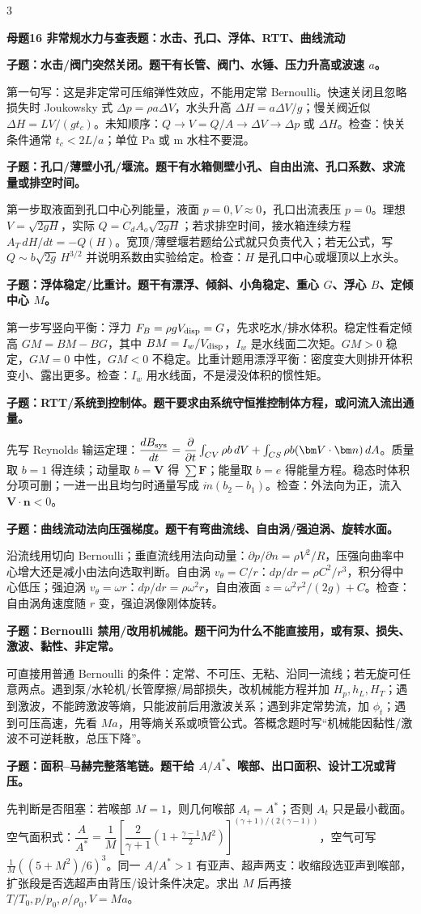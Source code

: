 \documentclass[a4paper]{article}
\newcommand{\mt}[1]{\vspace{0.45pt}\colorbox{M}{\parbox{\dimexpr\linewidth-2\fboxsep}{\color{white}\bfseries #1}}\par}
\newcommand{\qt}[1]{\vspace{0.25pt}\colorbox{Q}{\parbox{\dimexpr\linewidth-2\fboxsep}{\color{white}\bfseries #1}}\par}
\newcommand{\ans}[1]{\colorbox{G}{\parbox{\dimexpr\linewidth-2\fboxsep}{#1}}\par}
\begin{document}
\begin{multicols}{3}
\mt{母题16 非常规水力与查表题：水击、孔口、浮体、RTT、曲线流动}
\qt{子题：水击/阀门突然关闭。题干有长管、阀门、水锤、压力升高或波速 $a$。}
\ans{第一句写：这是非定常可压缩弹性效应，不能用定常 Bernoulli。快速关闭且忽略损失时 Joukowsky 式 $\Delta p=\rho a\Delta V$，水头升高 $\Delta H=a\Delta V/g$；慢关阀近似 $\Delta H=LV/(gt_c)$。未知顺序：$Q\to V=Q/A\to\Delta V\to\Delta p$ 或 $\Delta H$。检查：快关条件通常 $t_c<2L/a$；单位 Pa 或 m 水柱不要混。}
\qt{子题：孔口/薄壁小孔/堰流。题干有水箱侧壁小孔、自由出流、孔口系数、求流量或排空时间。}
\ans{第一步取液面到孔口中心列能量，液面 $p=0,V\approx0$，孔口出流表压 $p=0$。理想 $V=\sqrt{2gH}$，实际 $Q=C_dA_o\sqrt{2gH}$；若求排空时间，接水箱连续方程 $A_T\,dH/dt=-Q(H)$。宽顶/薄壁堰若题给公式就只负责代入；若无公式，写 $Q\sim b\sqrt{2g}\,H^{3/2}$ 并说明系数由实验给定。检查：$H$ 是孔口中心或堰顶以上水头。}
\qt{子题：浮体稳定/比重计。题干有漂浮、倾斜、小角稳定、重心 $G$、浮心 $B$、定倾中心 $M$。}
\ans{第一步写竖向平衡：浮力 $F_B=\rho gV_{\rm disp}=G$，先求吃水/排水体积。稳定性看定倾高 $GM=BM-BG$，其中 $BM=I_w/V_{\rm disp}$，$I_w$ 是水线面二次矩。$GM>0$ 稳定，$GM=0$ 中性，$GM<0$ 不稳定。比重计题用漂浮平衡：密度变大则排开体积变小、露出更多。检查：$I_w$ 用水线面，不是浸没体积的惯性矩。}
\qt{子题：RTT/系统到控制体。题干要求由系统守恒推控制体方程，或问流入流出通量。}
\ans{先写 Reynolds 输运定理：$\dfrac{dB_{\rm sys}}{dt}=\dfrac{\partial}{\partial t}\int_{CV}\rho b\,dV+\int_{CS}\rho b(\bm V\cdot\bm n)\,dA$。质量取 $b=1$ 得连续；动量取 $b=\bm V$ 得 $\sum\bm F$；能量取 $b=e$ 得能量方程。稳态时体积分项可删；一进一出且均匀时通量写成 $\dot m(b_2-b_1)$。检查：外法向为正，流入 $\bm V\cdot\bm n<0$。}
\qt{子题：曲线流动法向压强梯度。题干有弯曲流线、自由涡/强迫涡、旋转水面。}
\ans{沿流线用切向 Bernoulli；垂直流线用法向动量：$\partial p/\partial n=\rho V^2/R$，压强向曲率中心增大还是减小由法向选取判断。自由涡 $v_\theta=C/r$：$dp/dr=\rho C^2/r^3$，积分得中心低压；强迫涡 $v_\theta=\omega r$：$dp/dr=\rho\omega^2r$，自由液面 $z=\omega^2r^2/(2g)+C$。检查：自由涡角速度随 $r$ 变，强迫涡像刚体旋转。}
\qt{子题：Bernoulli 禁用/改用机械能。题干问为什么不能直接用，或有泵、损失、激波、黏性、非定常。}
\ans{可直接用普通 Bernoulli 的条件：定常、不可压、无粘、沿同一流线；若无旋可任意两点。遇到泵/水轮机/长管摩擦/局部损失，改机械能方程并加 $H_p,h_L,H_T$；遇到激波，不能跨激波等熵，只能波前后用激波关系；遇到非定常势流，加 $\phi_t$；遇到可压高速，先看 $Ma$，用等熵关系或喷管公式。答概念题时写“机械能因黏性/激波不可逆耗散，总压下降”。}
\qt{子题：面积--马赫完整落笔链。题干给 $A/A^*$、喉部、出口面积、设计工况或背压。}
\ans{先判断是否阻塞：若喉部 $M=1$，则几何喉部 $A_t=A^*$；否则 $A_t$ 只是最小截面。空气面积式：$\dfrac{A}{A^*}=\dfrac1M\left[\dfrac{2}{\gamma+1}(1+\frac{\gamma-1}{2}M^2)\right]^{(\gamma+1)/(2(\gamma-1))}$，空气可写 $\frac1M((5+M^2)/6)^3$。同一 $A/A^*>1$ 有亚声、超声两支：收缩段选亚声到喉部，扩张段是否选超声由背压/设计条件决定。求出 $M$ 后再接 $T/T_0,p/p_0,\rho/\rho_0,V=Ma$。}

\end{multicols}
\end{document}
